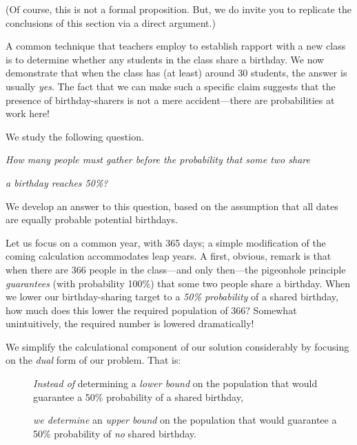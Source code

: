 \smallskip

\noindent
(Of course, this is not a formal  proposition. But, we do invite you to replicate the conclusions of this section via a direct argument.)

\bigskip

A common technique that teachers employ to establish rapport with a new class is to determine whether any students in the class share a birthday.  We now demonstrate that when the class has (at least) around 30 students, the answer is usually \textit{yes}.  The fact that we can make such a specific claim suggests that the presence of birthday-sharers is not a mere accident---there are probabilities at work here!

\medskip

\noindent
We study the following question.

\smallskip

{\it How many people must gather before the probability that some two share}

{\it a birthday reaches 50\%?}

\medskip

\noindent
We develop an answer to this question, based on the assumption that all dates are equally probable potential birthdays.

\bigskip

Let us focus on a common year, with 365 days; a simple modification of the coming calculation 
accommodates leap years.  A first, obvious, remark is that when there are 366 people in the 
class---and only then---the pigeonhole principle {\em guarantees} (with probability 100\%)  that some two people share a birthday.  When we lower our birthday-sharing target to a  {\em 50\% probability} of a shared birthday, how much does this lower the required population  of 366?  Somewhat unintuitively, the required number is lowered dramatically!

\bigskip

We simplify the calculational component of our solution considerably by focusing on the  {\em dual} form of our problem.  That is:

\begin{description}
\item[]
{\em Instead of} determining a {\em lower bound} on the population that would guarantee a 50\% probability of a shared birthday,

\medskip\item[]
{\em we determine} an {\em upper bound} on the population that would guarantee a 50\% probability of {\em no} shared birthday.
\end{description}

